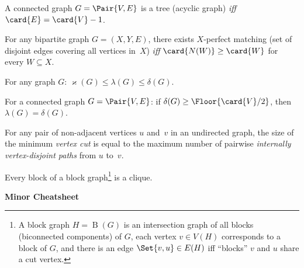 \documentclass[a4paper,12pt]{article}
\newcommand{\op}[1]{\operatorname*{#1}}
\newcommand{\minDegree}[1]{\delta(#1)}
\newcommand{\vertexConnectivity}[1]{\varkappa(#1)}
\newcommand{\edgeConnectivity}[1]{\lambda(#1)}
\newcommand{\blockGraph}[1]{\op{B}(#1)}
\begin{document}
\begin{tasks}

    \begin{theorem}[Tree]
        A connected graph $G = \Pair{V, E}$ is a tree (\ie acyclic graph) \emph{iff} $\card{E} = \card{V} - 1$.
    \end{theorem}

    \begin{theorem}[Hall]
        For any bipartite graph $G = (X, Y, E)$, there exists $X$-perfect matching (set of disjoint edges covering all vertices in~$X$) \emph{iff} $\card{N(W)} \geq \card{W}$ for every $W \subseteq X$.
    \end{theorem}

    \begin{theorem}[Whitney]
        For any graph $G$: $\vertexConnectivity{G} \leq \edgeConnectivity{G} \leq \minDegree{G}$.
    \end{theorem}

    \begin{theorem}[Chartrand]
        For a connected graph $G = \Pair{V, E}$: if $\minDegree{G} \geq \Floor{\card{V} / 2}$, then $\edgeConnectivity{G} = \minDegree{G}$.
    \end{theorem}

    \begin{theorem}[Menger]
        For any pair of non-adjacent vertices $u$ and~$v$ in an undirected graph, the size of the minimum \emph{vertex cut} is equal to the maximum number of pairwise \emph{internally vertex-disjoint paths} from $u$ to~$v$.
    \end{theorem}

    \begin{theorem}[Harary]
        Every block of a block graph\footnote{A block graph $H = \blockGraph{G}$ is an intersection graph of all blocks (biconnected components) of $G$, \ie each vertex $v \in V(H)$ corresponds to a block of $G$, and there is an edge $\Set{v,u} \in E(H)$ iff \enquote{blocks} $v$ and $u$ share a cut vertex.} is a clique.
    \end{theorem}

\end{tasks}


\iffalse

\newpage

\centerline{\textbf{Minor Cheatsheet}}
\end{document}
